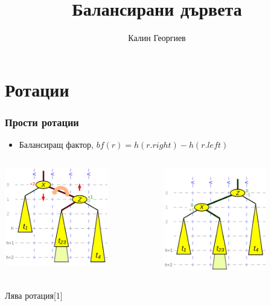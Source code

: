 \documentclass{beamer}
\begin{document}
\title[Структури от данни и програмиране]{Балансирани дървета}
\author{Калин Георгиев}
\frame{\titlepage}

\section{Ротации}

\begin{frame}[fragile]
\frametitle{Прости ротации}

\begin{itemize}
  \item Балансиращ фактор, $bf(r)=h(r.right)-h(r.left)$
\end{itemize}

\begin{columns}[t]
  \begin{column}{0.5\textwidth}
      \includegraphics[width=4.5cm]{images/bal_tree_left_rotation_1}
  \end{column}
  \begin{column}{0.5\textwidth}
       \includegraphics[width=4.5cm]{images/bal_tree_left_rotation_2}
  \end{column}
\end{columns}
\centerline{Лява ротация[1]}

\end{frame}
\end{document}

